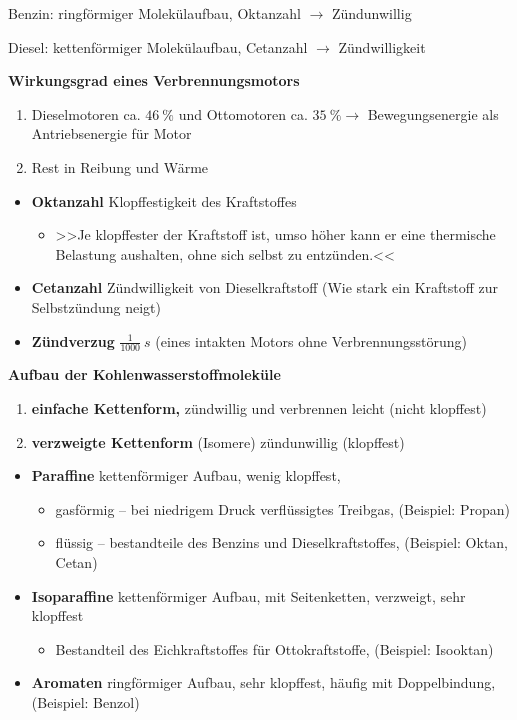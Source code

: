 Benzin: ringförmiger Molekülaufbau, Oktanzahl $\to$ Zündunwillig

Diesel: kettenförmiger Molekülaufbau, Cetanzahl $\to$ Zündwilligkeit

\textbf{Wirkungsgrad eines Verbrennungsmotors}

\begin{enumerate}
\item
  Dieselmotoren ca. $46~\%$ und Ottomotoren ca. $35~\% \to$
  Bewegungsenergie als Antriebsenergie für Motor
\item
  Rest in Reibung und Wärme
\end{enumerate}

\begin{itemize}
\item
  \textbf{Oktanzahl} Klopffestigkeit des Kraftstoffes

  \begin{itemize}
  \item
    >>Je klopffester der Kraftstoff ist, umso höher kann er eine
    thermische Belastung aushalten, ohne sich selbst zu entzünden.<<
  \end{itemize}
\item
  \textbf{Cetanzahl} Zündwilligkeit von Dieselkraftstoff (Wie stark ein
  Kraftstoff zur Selbstzündung neigt)
\item
  \textbf{Zündverzug} $\frac{1}{1000}~s$ (eines intakten Motors ohne
  Verbrennungsstörung)
\end{itemize}

\textbf{Aufbau der Kohlenwasserstoffmoleküle}

\begin{enumerate}
\item
  \textbf{einfache Kettenform,} zündwillig und verbrennen leicht (nicht
  klopffest)
\item
  \textbf{verzweigte Kettenform} (Isomere) zündunwillig (klopffest)
\end{enumerate}

\begin{itemize}
\item
  \textbf{Paraffine} kettenförmiger Aufbau, wenig klopffest,

  \begin{itemize}
  \item
    gasförmig -- bei niedrigem Druck verflüssigtes Treibgas, (Beispiel:
    Propan)
  \item
    flüssig -- bestandteile des Benzins und Dieselkraftstoffes,
    (Beispiel: Oktan, Cetan)
  \end{itemize}
\item
  \textbf{Isoparaffine} kettenförmiger Aufbau, mit Seitenketten,
  verzweigt, sehr klopffest

  \begin{itemize}
  \item
    Bestandteil des Eichkraftstoffes für Ottokraftstoffe, (Beispiel:
    Isooktan)
  \end{itemize}
\item
  \textbf{Aromaten} ringförmiger Aufbau, sehr klopffest, häufig mit
  Doppelbindung,(Beispiel: Benzol)
\end{itemize}

